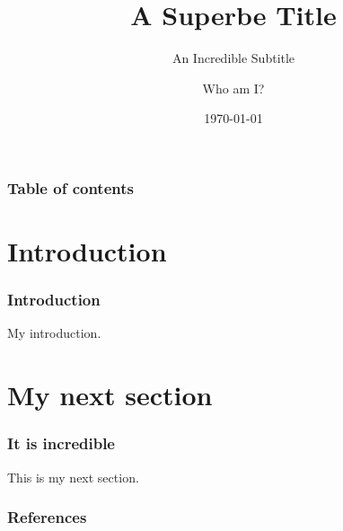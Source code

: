 \documentclass{presentation}
\title{A Superbe Title}
\subtitle{An Incredible Subtitle}
\date{\today}
\author{Who am I?}
\institute[PolyU, HK]{
    Department of Applied Mathematics\\
    The Hong Kong Polytechnic University
}
\begin{document}
\maketitle

\begin{frame}[nopagination]
    \frametitle{Table of contents}
    
	\tableofcontents[hideallsubsections]
\end{frame}

\section{Introduction}

\begin{frame}
    \frametitle{Introduction}
    
	My introduction.
\end{frame}

\section{My next section}

\begin{frame}
    \frametitle{It is incredible}
    
	This is my next section.
\end{frame}

\appendix

\begin{frame}[t,allowframebreaks]
    \frametitle{References}

    \AtNextBibliography{\small}
	\printbibliography
\end{frame}
\end{document}
